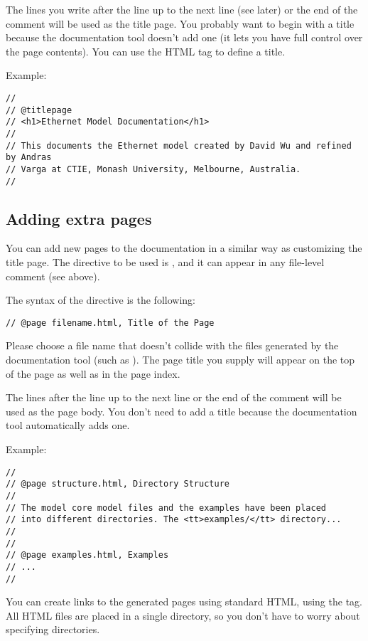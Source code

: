 The lines you write after the  line up to the next
 line (see later) or the end of the comment will be used
as the title page.
You probably want to begin with a title because the documentation
tool doesn't add one (it lets you have full control over the
page contents). You can use the  HTML tag
to define a title.

Example:

\begin{verbatim}
//
// @titlepage
// <h1>Ethernet Model Documentation</h1>
//
// This documents the Ethernet model created by David Wu and refined by Andras
// Varga at CTIE, Monash University, Melbourne, Australia.
//
\end{verbatim}


\subsection{Adding extra pages}

You can add new pages to the documentation in a similar way as customizing
the title page. The directive to be used is , and it can
appear in any file-level comment (see above).

The syntax of the  directive is the following:

\begin{verbatim}
// @page filename.html, Title of the Page
\end{verbatim}

Please choose a file name that doesn't collide with the files generated
by the documentation tool (such as ).
The page title you supply will appear on the top of the page as well as
in the page index.

The lines after the  line up to the next  line
or the end of the comment will be used as the page body.
You don't need to add a title because the documentation tool
automatically adds one.

Example:
\begin{verbatim}
//
// @page structure.html, Directory Structure
//
// The model core model files and the examples have been placed
// into different directories. The <tt>examples/</tt> directory...
//
//
// @page examples.html, Examples
// ...
//
\end{verbatim}

You can create links to the generated pages using standard HTML,
using the  tag. All HTML files are
placed in a single directory, so you don't have to worry about
specifying directories.

